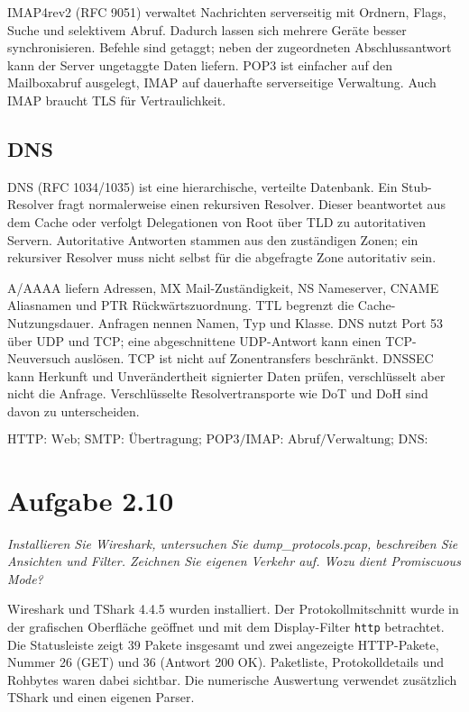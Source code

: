 \documentclass[a4paper,11pt]{article}
\newif\ifexplain
\newcommand{\aufgabe}[1]{\section*{Aufgabe #1}}
\newcommand{\angabe}[1]{{\raggedright\textit{#1}\par}\smallskip}
\newcommand{\explain}[1]{\ifexplain\begin{erklbox}#1\end{erklbox}\fi}
\begin{document}
IMAP4rev2 (RFC 9051) verwaltet Nachrichten serverseitig mit Ordnern, Flags, Suche und selektivem Abruf. Dadurch lassen sich mehrere Geräte besser synchronisieren. Befehle sind getaggt; neben der zugeordneten Abschlussantwort kann der Server ungetaggte Daten liefern. POP3 ist einfacher auf den Mailboxabruf ausgelegt, IMAP auf dauerhafte serverseitige Verwaltung. Auch IMAP braucht TLS für Vertraulichkeit.
\subsection*{DNS}
DNS (RFC 1034/1035) ist eine hierarchische, verteilte Datenbank. Ein Stub-Resolver fragt normalerweise einen rekursiven Resolver. Dieser beantwortet aus dem Cache oder verfolgt Delegationen von Root über TLD zu autoritativen Servern. Autoritative Antworten stammen aus den zuständigen Zonen; ein rekursiver Resolver muss nicht selbst für die abgefragte Zone autoritativ sein.

A/AAAA liefern Adressen, MX Mail-Zuständigkeit, NS Nameserver, CNAME Aliasnamen und PTR Rückwärtszuordnung. TTL begrenzt die Cache-Nutzungsdauer. Anfragen nennen Namen, Typ und Klasse. DNS nutzt Port 53 über UDP und TCP; eine abgeschnittene UDP-Antwort kann einen TCP-Neuversuch auslösen. TCP ist nicht auf Zonentransfers beschränkt. DNSSEC kann Herkunft und Unverändertheit signierter Daten prüfen, verschlüsselt aber nicht die Anfrage. Verschlüsselte Resolvertransporte wie DoT und DoH sind davon zu unterscheiden.
\explain{SMTP schickt eine Nachricht zur nächsten zuständigen Stelle. POP3 und IMAP holen beziehungsweise verwalten bereits gespeicherte Nachrichten. DNS hilft unter anderem dabei, den zuständigen Mailserver zu finden: MX ist deshalb kein Mailübertragungsprotokoll, sondern ein DNS-Datensatz.}
\[\boxed{\text{HTTP: Web; SMTP: Übertragung; POP3/IMAP: Abruf/Verwaltung; DNS: Namensdaten.}}\]

\aufgabe{2.10}
\angabe{Installieren Sie Wireshark, untersuchen Sie dump\_protocols.pcap, beschreiben Sie Ansichten und Filter. Zeichnen Sie eigenen Verkehr auf. Wozu dient Promiscuous Mode?}
Wireshark und TShark 4.4.5 wurden installiert. Der Protokollmitschnitt wurde in der grafischen Oberfläche geöffnet und mit dem Display-Filter \texttt{http} betrachtet. Die Statusleiste zeigt 39 Pakete insgesamt und zwei angezeigte HTTP-Pakete, Nummer 26 (GET) und 36 (Antwort 200 OK). Paketliste, Protokolldetails und Rohbytes waren dabei sichtbar. Die numerische Auswertung verwendet zusätzlich TShark und einen eigenen Parser.
\end{document}
